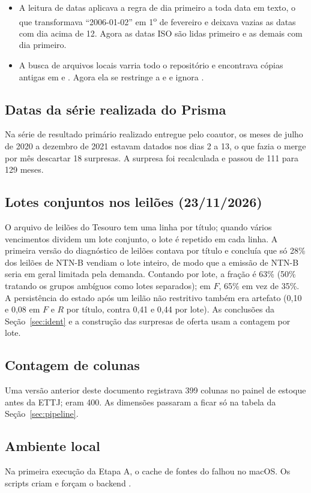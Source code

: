 \documentclass[12pt,a4paper]{article}
\begin{document}
\begin{itemize}[leftmargin=1.2cm]
    \item A leitura de datas aplicava a regra de dia primeiro a toda data em texto,
    o que transformava ``2006-01-02'' em 1\textsuperscript{o} de fevereiro e deixava
    vazias as datas com dia acima de 12. Agora as datas ISO são lidas primeiro e as
    demais com dia primeiro.
    \item A busca de arquivos locais varria todo o repositório e encontrava cópias
    antigas em  e . Agora ela se restringe a
     e  e ignora
    .
\end{itemize}

\subsection{Datas da série realizada do Prisma}

Na série de resultado primário realizado entregue pelo coautor, os meses de julho
de 2020 a dezembro de 2021 estavam datados nos dias 2 a 13, o que fazia o merge por
mês descartar 18 surpresas. A surpresa foi recalculada e passou de 111 para 129
meses.

\subsection{Lotes conjuntos nos leilões (23/11/2026)}

O arquivo de leilões do Tesouro tem uma linha por título; quando vários vencimentos
dividem um lote conjunto, o lote é repetido em cada linha. A primeira versão do
diagnóstico de leilões contava por título e concluía que só 28\% dos leilões de
NTN-B vendiam o lote inteiro, de modo que a emissão de NTN-B seria em geral
limitada pela demanda. Contando por lote, a fração é 63\% (50\% tratando os grupos
ambíguos como lotes separados); em \(F\), 65\% em vez de 35\%. A persistência do
estado após um leilão não restritivo também era artefato (0,10 e 0,08 em \(F\) e
\(R\) por título, contra 0,41 e 0,44 por lote). As conclusões da
Seção~\ref{sec:ident} e a construção das surpresas de oferta usam a contagem por
lote.

\subsection{Contagem de colunas}

Uma versão anterior deste documento registrava 399 colunas no painel de estoque
antes da ETTJ; eram 400. As dimensões passaram a ficar só na tabela da
Seção~\ref{sec:pipeline}.

\subsection{Ambiente local}

Na primeira execução da Etapa A, o cache de fontes do  falhou no
macOS. Os scripts criam  e forçam o backend .
\end{document}
